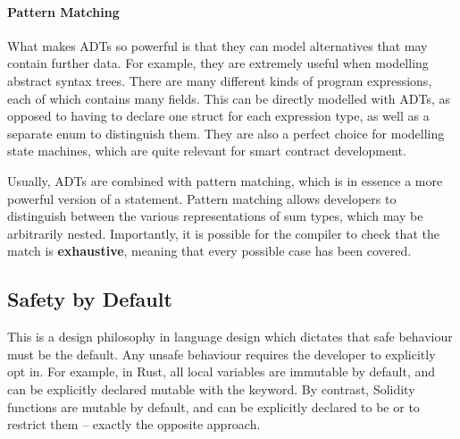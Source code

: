 \paragraph{Pattern Matching}
What makes ADTs so powerful is that they can model alternatives that may contain further data. For example, they are extremely useful when modelling abstract syntax trees. There are many different kinds of program expressions, each of which contains many fields. This can be directly modelled with ADTs, as opposed to having to declare one struct for each expression type, as well as a separate enum to distinguish them. They are also a perfect choice for modelling state machines, which are quite relevant for smart contract development. \par
Usually, ADTs are combined with pattern matching, which is in essence a more powerful version of a  statement. Pattern matching allows developers to distinguish between the various representations of sum types, which may be arbitrarily nested. Importantly, it is possible for the compiler to check that the match is \textbf{exhaustive}, meaning that every possible case has been covered.

\subsection{Safety by Default}
This is a design philosophy in language design which dictates that safe behaviour must be the default. Any unsafe behaviour requires the developer to explicitly opt in. For example, in Rust, all local variables are immutable by default, and can be explicitly declared mutable with the  keyword. By contrast, Solidity functions are mutable by default, and can be explicitly declared to be  or  to restrict them -- exactly the opposite approach.

